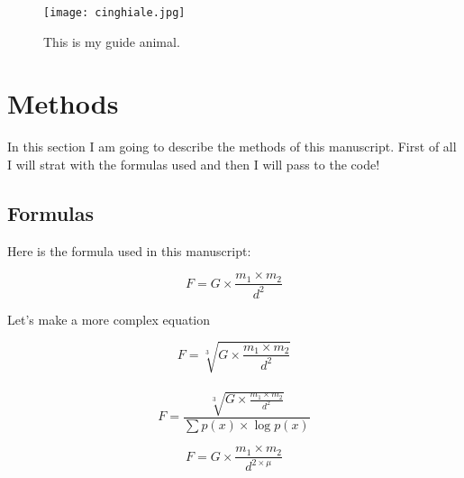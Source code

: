 \begin{figure}
\centering  %
\texttt{[image: cinghiale.jpg]}  %
\caption{This is my guide animal.}  %
\label{fig:cinghiale}   %
\end{figure}


\section{Methods}

In this section I am going to describe the methods of this manuscript. First of all I will strat with the formulas used and then I will pass to the code!
 
\subsection{Formulas}  %
Here is the formula used in this manuscript:


\begin{equation}   %
 F = G \times \frac{m_{1} \times m_{2}}{d^{2}}
\label{eq:newton}
\end{equation}

Let's make a more complex equation

\begin{equation}
 F = \sqrt[3]{G \times \frac{m_{1} \times m_{2}}{d^{2}}}
\label{eq:galileo2}
\end{equation}
 
\begin{equation}
F = \frac{\sqrt[3]{G \times \frac{m_{1} \times m_{2}}{d^{2}}}}{\sum{p(x) \times \log{p(x)}}}
\label{eq:galileo3}
\end{equation}

\begin{equation}
F = G \times \frac{m_{1} \times m_{2}}{d^{2 \times \mu}}  %
\label{eq:newton2}
\end{equation}

 
